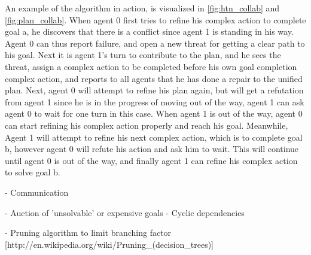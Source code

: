 \documentclass[Main]{subfiles}
\begin{document}
An example of the algorithm in action, is visualized in \ref{fig:htn_collab} and \ref{fig:plan_collab}.
When agent 0 first tries to refine his complex action to complete goal a, he discovers that there is a conflict since agent 1 is standing in his way.
Agent 0 can thus report failure, and open a new threat for getting a clear path to his goal.
Next it is agent 1's turn to contribute to the plan, and he sees the threat, assign a complex action to be completed before his own goal completion complex action, and reports to all agents that he has done a repair to the unified plan.
Next, agent 0 will attempt to refine his plan again, but will get a refutation from agent 1 since he is in the progress of moving out of the way, agent 1 can ask agent 0 to wait for one turn in this case. When agent 1 is out of the way, agent 0 can start refining his complex action properly and reach his goal.
Meanwhile, Agent 1 will attempt to refine his next complex action, which is to complete goal b, however agent 0 will refute his action and ask him to wait. This will continue until agent 0 is out of the way, and finally agent 1 can refine his complex action to solve goal b.

- Communication

- Auction of 'unsolvable' or expensive goals \cite{VanderKrogt2005}
  - Cyclic dependencies 


- Pruning algorithm to limit branching factor [http://en.wikipedia.org/wiki/Pruning\_(decision\_trees)]
\end{document}
